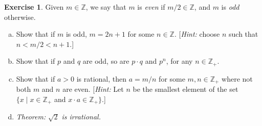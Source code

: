 \documentclass[11pt,a4paper,twoside]{article}
\theoremstyle{definition}
\newcounter{excounter}
\newtheorem{exercise}[excounter]{Exercise}
\begin{document}
\begin{exercise}

  Given $m \in \mathbb{Z}$, we say that $m$ is \emph{even} if $m / 2 \in \mathbb{Z}$, and $m$ is \emph{odd} otherwise.

  \begin{enumerate}[(a)]

  \item Show that if $m$ is odd, $m = 2 n + 1$ for some $n \in \mathbb{Z}$. [\emph{Hint:} choose $n$ such that $n < m / 2 < n + 1$.]
  \item Show that if $p$ and $q$ are odd, so are $p \cdot q$ and $p^n$, for any $n \in \mathbb{Z}_+$.
  \item Show that if $a > 0$ is rational, then $a = m / n$ for some $m, n \in \mathbb{Z}_+$ where not both $m$ and $n$ are even.
    [\emph{Hint:} Let $n$ be the smallest element of the set $\{ x \mid x \in \mathbb{Z}_+$ and $x \cdot a \in \mathbb{Z}_+ \}$.]
  \item \emph{Theorem: }$\sqrt{2}$ \emph{is irrational.}

  \end{enumerate}

\end{exercise}
\end{document}
